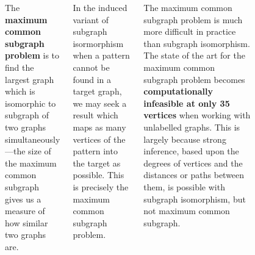 \documentclass[a0paper]{tikzposter}
\begin{document}
\begin{columns}
{\begin{figure}
\begin{center}
\end{center}
\end{figure}

The \textbf{maximum common subgraph problem} is to find the largest graph which is isomorphic to  subgraph of two graphs simultaneously---the size of the maximum common subgraph gives us a measure of how similar two graphs are.

\bigskip

In the induced variant of subgraph isormorphism when a pattern cannot be found in a target graph, we may seek a result which maps as many vertices of the pattern into the target as possible.  This is precisely the maximum common subgraph problem.

\bigskip

The maximum common subgraph problem is much more difficult in practice than subgraph isomorphism.
The state of the art for the maximum common subgraph
problem becomes \textbf{computationally
infeasible at only 35 vertices} when working with
unlabelled graphs. This is largely because strong inference,
based upon the degrees of vertices and the
distances or paths between them, is possible with subgraph isomorphism,
but not maximum common subgraph.}


\end{columns}
\end{document}

